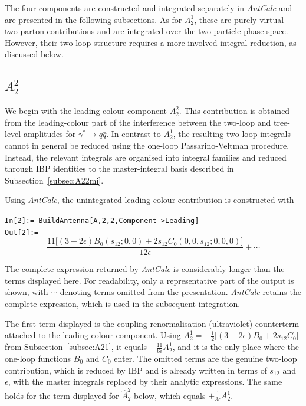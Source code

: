 The four components are constructed and integrated separately in \textit{AntCalc} and are presented
in the following subsections. As for $A_2^1$, these are purely virtual two-parton contributions and
are integrated over the two-particle phase space. However, their two-loop structure requires a more
involved integral reduction, as discussed below.

\subsection{$A_2^2$}

We begin with the leading-colour component $A_2^2$. This contribution is obtained from the
leading-colour part of the interference between the two-loop and tree-level amplitudes for
$\gamma^*\to q\bar q$.
In contrast to $A_2^1$, the resulting two-loop integrals cannot in general be reduced using the
one-loop Passarino-Veltman procedure. Instead, the relevant integrals are organised into integral
families and reduced through IBP identities to the master-integral basis described in
Subsection~\ref{subsec:A22mi}.

Using \textit{AntCalc}, the unintegrated leading-colour contribution is constructed with

\begin{mdframed}[backgroundcolor=gray!10, linewidth=0pt]
\texttt{In[2]:= BuildAntenna[A,2,2,Component->Leading]}\\
\hfill
\texttt{Out[2]:=}
    \begin{equation*}
        \frac{11\Big[(3+2\epsilon)B_0\!\left(s_{12};0,0\right)+2s_{12}C_0\!\left(0,0,s_{12};0,0,0\right)\Big]}{12\epsilon}+\cdots
    \end{equation*}
\end{mdframed}

The complete expression returned by \textit{AntCalc} is considerably longer than the terms displayed
here. For readability, only a representative part of the output is shown, with $\cdots$ denoting
terms omitted from the presentation. \textit{AntCalc} retains the complete expression, which is used
in the subsequent integration.

The first term displayed is the coupling-renormalisation (ultraviolet) counterterm attached to the
leading-colour component. Using $A_2^1=-\tfrac12\big[(3+2\epsilon)B_0+2s_{12}C_0\big]$ from
Subsection~\ref{subsec:A21}, it equals $-\tfrac{11}{6\epsilon}A_2^1$, and it is the only place where
the one-loop functions $B_0$ and $C_0$ enter. The omitted terms are the genuine two-loop
contribution, which is reduced by IBP and is already written in terms of $s_{12}$ and $\epsilon$,
with the master integrals replaced by their analytic expressions. The same holds for the term
displayed for $\hat A_2^2$ below, which equals $+\tfrac{1}{3\epsilon}A_2^1$.

